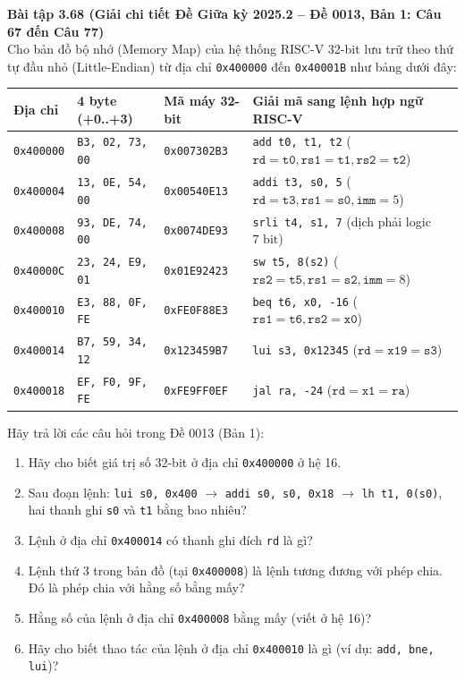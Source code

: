 \textbf{Bài tập 3.68 (Giải chi tiết Đề Giữa kỳ 2025.2 -- Đề 0013, Bản 1: Câu 67 đến Câu 77)}\\
Cho bản đồ bộ nhớ (Memory Map) của hệ thống RISC-V 32-bit lưu trữ theo thứ tự đầu nhỏ (Little-Endian) từ địa chỉ \texttt{0x400000} đến \texttt{0x40001B} như bảng dưới đây:
\begin{center}
\renewcommand{\arraystretch}{1.15}
\footnotesize
\begin{tabularx}{\linewidth}{|C{1.8cm}|C{3.1cm}|C{2.4cm}|Y|}
\hline
\textbf{Địa chỉ} & \textbf{4 byte (+0..+3)} & \textbf{Mã máy 32-bit} & \textbf{Giải mã sang lệnh hợp ngữ RISC-V} \\ \hline
\texttt{0x400000} & \texttt{B3, 02, 73, 00} & \texttt{0x007302B3} & \texttt{add t0, t1, t2} ($\texttt{rd}=\texttt{t0}, \texttt{rs1}=\texttt{t1}, \texttt{rs2}=\texttt{t2}$) \\ \hline
\texttt{0x400004} & \texttt{13, 0E, 54, 00} & \texttt{0x00540E13} & \texttt{addi t3, s0, 5} ($\texttt{rd}=\texttt{t3}, \texttt{rs1}=\texttt{s0}, \texttt{imm}=5$) \\ \hline
\texttt{0x400008} & \texttt{93, DE, 74, 00} & \texttt{0x0074DE93} & \texttt{srli t4, s1, 7} (dịch phải logic $7\text{ bit}$) \\ \hline
\texttt{0x40000C} & \texttt{23, 24, E9, 01} & \texttt{0x01E92423} & \texttt{sw t5, 8(s2)} ($\texttt{rs2}=\texttt{t5}, \texttt{rs1}=\texttt{s2}, \texttt{imm}=8$) \\ \hline
\texttt{0x400010} & \texttt{E3, 88, 0F, FE} & \texttt{0xFE0F88E3} & \texttt{beq t6, x0, -16} ($\texttt{rs1}=\texttt{t6}, \texttt{rs2}=\texttt{x0}$) \\ \hline
\texttt{0x400014} & \texttt{B7, 59, 34, 12} & \texttt{0x123459B7} & \texttt{lui s3, 0x12345} ($\texttt{rd}=\texttt{x19}=\texttt{s3}$) \\ \hline
\texttt{0x400018} & \texttt{EF, F0, 9F, FE} & \texttt{0xFE9FF0EF} & \texttt{jal ra, -24} ($\texttt{rd}=\texttt{x1}=\texttt{ra}$) \\ \hline
\end{tabularx}
\end{center}
Hãy trả lời các câu hỏi trong Đề 0013 (Bản 1):
\begin{enumerate}[label=\textbf{Câu \arabic*.}, start=67]
    \item Hãy cho biết giá trị số 32-bit ở địa chỉ \texttt{0x400000} ở hệ 16.
    \item Sau đoạn lệnh: \texttt{lui s0, 0x400} $\rightarrow$ \texttt{addi s0, s0, 0x18} $\rightarrow$ \texttt{lh t1, 0(s0)}, hai thanh ghi \texttt{s0} và \texttt{t1} bằng bao nhiêu?
    \item Lệnh ở địa chỉ \texttt{0x400014} có thanh ghi đích \texttt{rd} là gì?
    \item Lệnh thứ 3 trong bản đồ (tại \texttt{0x400008}) là lệnh tương đương với phép chia. Đó là phép chia với hằng số bằng mấy?
    \item Hằng số của lệnh ở địa chỉ \texttt{0x400008} bằng mấy (viết ở hệ 16)?
    \item Hãy cho biết thao tác của lệnh ở địa chỉ \texttt{0x400010} là gì (ví dụ: \texttt{add, bne, lui})?
\end{enumerate}
